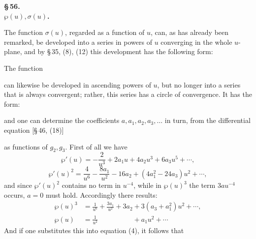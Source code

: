 
\begin{center}
\textbf{\S\,56. }\\
{\boldmath\textbf{$\wp(u), \sigma(u)$.}}
\end{center}

The function $\sigma(u)$, regarded as a function of $u$, can, as has
already been remarked, be developed into a series in powers of $u$
converging in the whole $u$-plane, and by \S\,35, (8), (12)
this development has the following form:


The function


can likewise be developed in ascending powers of $u$, but no longer
into a series that is always convergent; rather, this series has a
circle of convergence. It has the form:


and one can determine the coefficients $a, a_1, a_2, a_3, \ldots$ in turn,
from the differential equation [\S\,46, (18)]


as functions of $g_2, g_3$.
First of all we have
\[
\wp'(u) = -\frac{2}{u^3} + 2a_1 u + 4a_2 u^3 + 6a_3 u^5 + \cdots,
\]
\[
\wp'(u)^2 = \frac{4}{u^6} - \frac{8a_1}{u^2} - 16a_2 + (4a_1^2 - 24a_3)u^2 + \cdots,
\]
and since $\wp'(u)^2$ contains no term in $u^{-4}$, while in $\wp(u)^3$
the term $3au^{-4}$ occurs, $a=0$ must hold. Accordingly there
results:
\[
\begin{aligned}
\wp(u)^3 &= \frac{1}{u^6} + \frac{3a_1}{u^2} + 3a_2 + 3(a_3+a_1^2)u^2 + \cdots,\\
\wp(u) &= \frac{1}{u^2} \phantom{{}+ \frac{3a_1}{u^2} + 3a_2{}} + a_1 u^2 + \cdots
\end{aligned}
\]
And if one substitutes this into equation (4), it follows that

